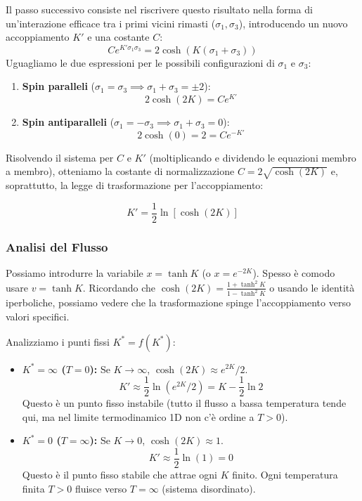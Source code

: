 Il passo successivo consiste nel riscrivere questo risultato nella forma di un'interazione efficace tra i primi vicini rimasti ($\sigma_1, \sigma_3$), introducendo un nuovo accoppiamento $K'$ e una costante $C$:
\begin{equation}
    C e^{K' \sigma_1 \sigma_3} = 2 \cosh(K(\sigma_1 + \sigma_3))
\end{equation}
Uguagliamo le due espressioni per le possibili configurazioni di $\sigma_1$ e $\sigma_3$:
\begin{enumerate}
    \item \textbf{Spin paralleli} ($\sigma_1 = \sigma_3 \implies \sigma_1 + \sigma_3 = \pm 2$):
    \begin{equation}
        2 \cosh(2K) = C e^{K'}
    \end{equation}
    \item \textbf{Spin antiparalleli} ($\sigma_1 = -\sigma_3 \implies \sigma_1 + \sigma_3 = 0$):
    \begin{equation}
        2 \cosh(0) = 2 = C e^{-K'}
    \end{equation}
\end{enumerate}



Risolvendo il sistema per $C$ e $K'$ (moltiplicando e dividendo le equazioni membro a membro), otteniamo la costante di normalizzazione $C = 2 \sqrt{\cosh(2K)}$ e, soprattutto, la legge di trasformazione per l'accoppiamento:

\begin{tcolorbox}[colback=yellow!25, colframe=yellow!75!orange,  coltitle=black,  title=\textbf{Relazione di ricorrenza del Gruppo di Rinormalizzazione}]
\begin{equation}
    K' = \frac{1}{2} \ln[\cosh(2K)]
\end{equation}
\end{tcolorbox}


\subsubsection{Analisi del Flusso}
Possiamo introdurre la variabile $x = \tanh K$ (o $x = e^{-2K}$). Spesso è comodo usare $v = \tanh K$.
Ricordando che $\cosh(2K) = \frac{1 + \tanh^2 K}{1 - \tanh^2 K}$ o usando le identità iperboliche, possiamo vedere che la trasformazione spinge l'accoppiamento verso valori specifici.

Analizziamo i punti fissi $K^* = f(K^*)$:
\begin{itemize}
    \item \textbf{$K^* = \infty$ ($T=0$):} Se $K \to \infty$, $\cosh(2K) \approx e^{2K}/2$.
    $$ K' \approx \frac{1}{2} \ln(e^{2K}/2) = K - \frac{1}{2}\ln 2 $$
    Questo è un punto fisso instabile (tutto il flusso a bassa temperatura tende qui, ma nel limite termodinamico 1D non c'è ordine a $T>0$).
    
    \item \textbf{$K^* = 0$ ($T=\infty$):} Se $K \to 0$, $\cosh(2K) \approx 1$.
    $$ K' \approx \frac{1}{2} \ln(1) = 0 $$
    Questo è il punto fisso stabile che attrae ogni $K$ finito. Ogni temperatura finita $T > 0$ fluisce verso $T = \infty$ (sistema disordinato).
\end{itemize}


